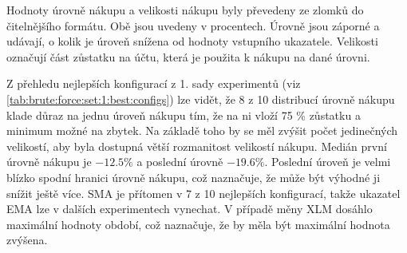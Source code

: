 Hodnoty úrovně nákupu a velikosti nákupu byly převedeny ze zlomků do čitelnějšího formátu.
Obě jsou uvedeny v procentech.
Úrovně jsou záporné a udávají, o kolik je úroveň snížena od hodnoty vstupního ukazatele.
Velikosti označují část zůstatku na účtu, která je použita k nákupu na dané úrovni.

Z přehledu nejlepších konfigurací z 1. sady experimentů (viz \ref{tab:brute:force:set:1:best:configs}) lze vidět, že 8 z 10 distribucí úrovně nákupu klade důraz na jednu úroveň nákupu tím, že na ni vloží 75 \% zůstatku a minimum možné na zbytek.
Na základě toho by se měl zvýšit počet jedinečných velikostí, aby byla dostupná větší rozmanitost velikostí nákupu.
Medián první úrovně nákupu je \(-12.5 \% \) a poslední úrovně \( -19.6 \% \). 
Poslední úroveň je velmi blízko spodní hranici úrovně nákupu, což naznačuje, že může být výhodné ji snížit ještě více.
SMA je přítomen v 7 z 10 nejlepších konfigurací, takže ukazatel EMA lze v dalších experimentech vynechat.
V případě měny XLM dosáhlo maximální hodnoty období, což naznačuje, že by měla být maximální hodnota zvýšena.

